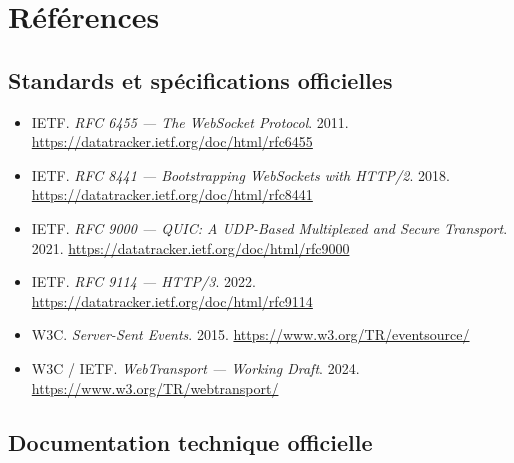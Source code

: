 \section{Références}

\subsection*{Standards et spécifications officielles}

\begin{itemize}
    \item IETF. \textit{RFC 6455 --- The WebSocket Protocol}. 2011. \url{https://datatracker.ietf.org/doc/html/rfc6455}
    \item IETF. \textit{RFC 8441 --- Bootstrapping WebSockets with HTTP/2}. 2018. \url{https://datatracker.ietf.org/doc/html/rfc8441}
    \item IETF. \textit{RFC 9000 --- QUIC: A UDP-Based Multiplexed and Secure Transport}. 2021. \url{https://datatracker.ietf.org/doc/html/rfc9000}
    \item IETF. \textit{RFC 9114 --- HTTP/3}. 2022. \url{https://datatracker.ietf.org/doc/html/rfc9114}
    \item W3C. \textit{Server-Sent Events}. 2015. \url{https://www.w3.org/TR/eventsource/}
    \item W3C / IETF. \textit{WebTransport --- Working Draft}. 2024. \url{https://www.w3.org/TR/webtransport/}
\end{itemize}

\subsection*{Documentation technique officielle}

